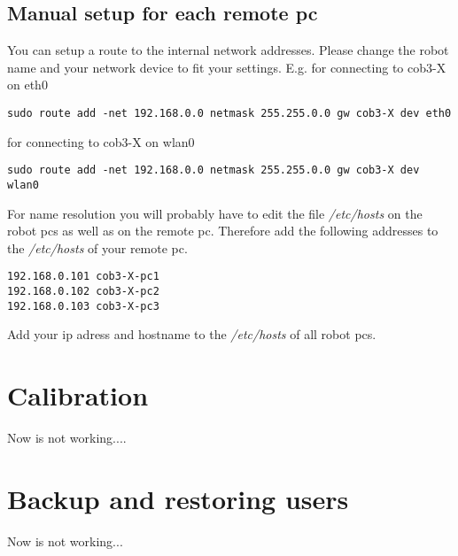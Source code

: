 \subsection{Manual setup for each remote pc}
You can setup a route to the internal network addresses. Please change the robot name and your network device to fit your settings. E.g. for connecting to cob3-X on eth0
\begin{lstlisting}
sudo route add -net 192.168.0.0 netmask 255.255.0.0 gw cob3-X dev eth0
\end{lstlisting}

for connecting to cob3-X on wlan0
\begin{lstlisting}
sudo route add -net 192.168.0.0 netmask 255.255.0.0 gw cob3-X dev wlan0
\end{lstlisting}


For name resolution you will probably have to edit the file \textit{/etc/hosts} on the robot pcs as well as on the remote pc. Therefore add the following addresses to the \textit{/etc/hosts} of your remote pc.
\begin{lstlisting}
192.168.0.101 cob3-X-pc1
192.168.0.102 cob3-X-pc2
192.168.0.103 cob3-X-pc3
\end{lstlisting}

Add your ip adress and hostname to the \textit{/etc/hosts} of all robot pcs.

\section{Calibration}
Now is not working....
\section{Backup and restoring users}   
Now is not working...    


